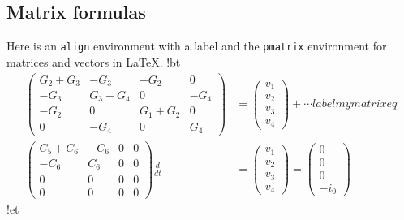 \documentclass[%
oneside,                 %
final,                   %
10pt]{article}
\begin{document}
\subsection{Matrix formulas}
Here is an \texttt{align} environment with a label and the \texttt{pmatrix}
environment for matrices and vectors in {\LaTeX}.
\blatexcod
!bt
\begin{align}
\begin{pmatrix}
G_2 + G_3 & -G_3 & -G_2 & 0 \\ 
-G_3 & G_3 + G_4 & 0 & -G_4 \\ 
-G_2 & 0 & G_1 + G_2 & 0 \\ 
0 & -G_4 & 0 & G_4
\end{pmatrix}
&=
\begin{pmatrix}
v_1 \\ 
v_2 \\ 
v_3 \\ 
v_4
\end{pmatrix}
+ \cdots
label{mymatrixeq}\\ 
\begin{pmatrix}
C_5 + C_6 & -C_6 & 0 & 0 \\ 
-C_6 & C_6 & 0 & 0 \\ 
0 & 0 & 0 & 0 \\ 
0 & 0 & 0 & 0
\end{pmatrix}
\frac{d}{dt} &=
\begin{pmatrix}
v_1 \\ 
v_2 \\ 
v_3 \\ 
v_4
\end{pmatrix} =
\begin{pmatrix}
0 \\ 
0 \\ 
0 \\ 
-i_0
\end{pmatrix}
\end{align}
!et

\elatexcod
\end{document}
